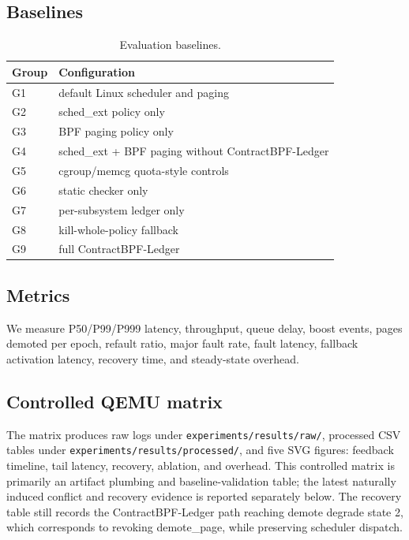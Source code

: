 \documentclass[letterpaper,twocolumn,10pt]{article}
\newcommand{\sys}{ContractBPF-Ledger\xspace}
\begin{document}
\subsection{Baselines}

\begin{table}[t]
\centering
\small
\caption{Evaluation baselines.}
\begin{tabular}{ll}
\toprule
Group & Configuration \\
\midrule
G1 & default Linux scheduler and paging \\
G2 & sched\_ext policy only \\
G3 & BPF paging policy only \\
G4 & sched\_ext + BPF paging without \sys \\
G5 & cgroup/memcg quota-style controls \\
G6 & static checker only \\
G7 & per-subsystem ledger only \\
G8 & kill-whole-policy fallback \\
G9 & full \sys \\
\bottomrule
\end{tabular}
\end{table}

\subsection{Metrics}

We measure P50/P99/P999 latency, throughput, queue delay, boost events, pages demoted per epoch, refault ratio, major fault rate, fault latency, fallback activation latency, recovery time, and steady-state overhead.

\subsection{Controlled QEMU matrix}



The matrix produces raw logs under \texttt{experiments/results/raw/}, processed
CSV tables under \texttt{experiments/results/processed/}, and five SVG figures:
feedback timeline, tail latency, recovery, ablation, and overhead. This
controlled matrix is primarily an artifact plumbing and baseline-validation
table; the latest naturally induced conflict and recovery evidence is reported
separately below. The recovery table still records the \sys path reaching
demote degrade state 2, which corresponds to revoking demote\_page, while
preserving scheduler dispatch.
\end{document}
